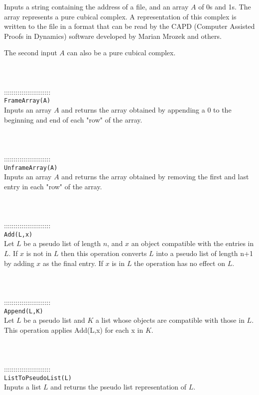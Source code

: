 \documentclass[a4paper,11pt]{report}
\begin{document}
{ Inputs a string containing the address of a file, and an array $A$ of 0s and 1s. The array represents a pure cubical complex. A representation of
this complex is written to the file in a format that can be read by the CAPD
(Computer Assisted Proofs in Dynamics) software developed by Marian Mrozek and
others. 

 The second input $A$ can also be a pure cubical complex. \\
 \\
 \\
 \\
 ::::::::::::::::::::::::\\
 \texttt{FrameArray(A)}\\
 

 Inputs an array $A$ and returns the array obtained by appending a 0 to the beginning and end of
each "row" of the array. \\
 \\
 \\
 \\
 ::::::::::::::::::::::::\\
 \texttt{UnframeArray(A)}\\
 

 Inputs an array $A$ and returns the array obtained by removing the first and last entry in each
"row" of the array. \\
 \\
 \\
 \\
 ::::::::::::::::::::::::\\
 \texttt{Add(L,x)}\\
 

 Let $L$ be a pseudo list of length $n$, and $x$ an object compatible with the entries in $L$. If $x$ is not in $L$ then this operation converts $L$ into a pseudo list of length n+1 by adding $x$ as the final entry. If $x$ is in $L$ the operation has no effect on $L$. \\
 \\
 \\
 \\
 ::::::::::::::::::::::::\\
 \texttt{Append(L,K)}\\
 

 Let $L$ be a pseudo list and $K$ a list whose objects are compatible with those in $L$. This operation applies Add(L,x) for each x in $K$. \\
\\
 \\
 \\
 ::::::::::::::::::::::::\\
 \texttt{ListToPseudoList(L)}\\
 

 Inputs a list $L$ and returns the pseudo list representation of $L$. \\
 \\
 \\
 }
\end{document}
